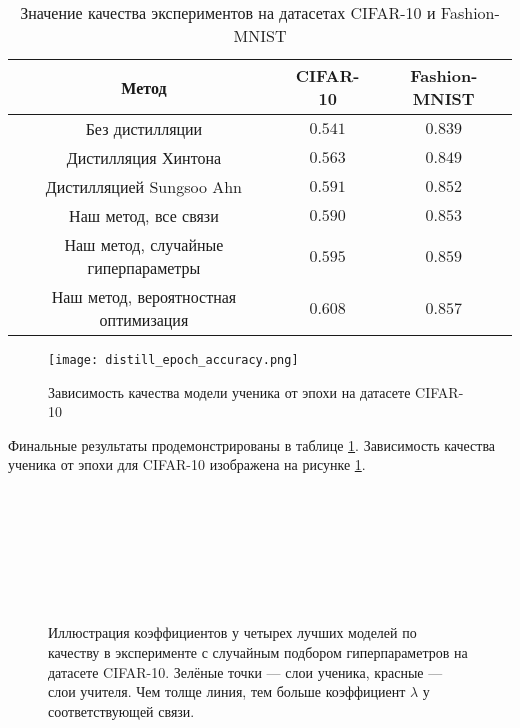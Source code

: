 \begin{table}[h!]
    \centering
    \begin{tabular}{|c|c|c|}
        \hline
        Метод                                & CIFAR-10 & Fashion-MNIST \\
        \hline \hline
        Без дистилляции                      & $0.541$  & $0.839$       \\ \hline
        Дистилляция Хинтона                  & $0.563$  & $0.849$       \\ \hline
        Дистилляцией Sungsoo Ahn             & $0.591$  & $0.852$       \\ \hline
        Наш метод, все связи                 & $0.590$  & $0.853$       \\ \hline
        Наш метод, случайные гиперпараметры  & $0.595$  & $0.859$       \\ \hline
        Наш метод, вероятностная оптимизация & $0.608$  & $0.857$       \\ \hline
    \end{tabular}
    \caption{Значение качества экспериментов на датасетах CIFAR-10 и Fashion-MNIST}
    \label{table:result_accuracy}
\end{table}

\begin{figure}[!htbp]
    \centering
    \texttt{[image: distill\_epoch\_accuracy.png]}
    \caption{Зависимость качества модели ученика от эпохи на датасете CIFAR-10}
    \label{fig:accuracy_cifar10}
\end{figure}


Финальные результаты продемонстрированы в таблице \ref{table:result_accuracy}. Зависимость качества ученика от эпохи для CIFAR-10 изображена на рисунке \ref{fig:accuracy_cifar10}.

\begin{figure}[H]
    \begin{minipage}[h]{0.35\linewidth}
         \\
    \end{minipage}
    \hfill
    \begin{minipage}[h]{0.35\linewidth}
         \\
    \end{minipage}
    \vfill
    \begin{minipage}[h]{0.35\linewidth}
         \\
    \end{minipage}
    \hfill
    \begin{minipage}[h]{0.35\linewidth}
         \\
    \end{minipage}
    \caption{Иллюстрация коэффициентов у четырех лучших моделей по качеству в эксперименте с случайным подбором гиперпараметров на датасете CIFAR-10.
        Зелёные точки --- слои ученика, красные --- слои учителя. Чем толще линия, тем больше коэффициент $\lambda$ у соответствующей связи.}
    \label{fig:lines}
\end{figure}

